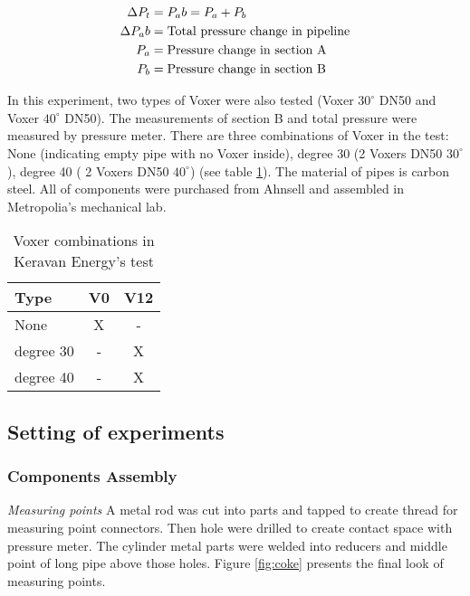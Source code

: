 \begin{align}
\Delta P_t&= P_ab = P_a + P_b \\
\Delta P_ab&= \textnormal{Total pressure change in pipeline} \\
P_a&= \textnormal{Pressure change in section A} \\
P_b&= \textnormal{Pressure change in section B} \\
\end{align}

In this experiment, two types of Voxer were also tested (Voxer $30^{\circ}$ DN50 and Voxer $40^{\circ}$ DN50). The measurements of section B and total pressure were measured by pressure meter. There are three combinations of Voxer in the test: None (indicating empty pipe with no Voxer inside), degree 30 (2 Voxers DN50 $30^{\circ}$), degree 40 ( 2 Voxers DN50 $40^{\circ}$) (see table \ref{table:kerava}). The material of pipes is carbon steel. All of components were purchased from Ahnsell and assembled in Metropolia's mechanical lab.

\begin{table}[h]
  \centering
  \caption{Voxer combinations in Keravan Energy's test}
  \begin{tabular}{l*{2}{c}}
Type             & V0 & V12 \\
\hline
None & X & -   \\
degree 30           & - & X   \\
degree 40          & - & X   \\
\end{tabular}
  \label{table:kerava}
\end{table}

\subsection{Setting of experiments}

\subsubsection{Components Assembly}

\textit{Measuring points}\newline
A metal rod was cut into parts and tapped to create thread for measuring point connectors. Then hole were drilled to create contact space with pressure meter. The cylinder metal parts were welded into reducers and middle point of long pipe above those holes. Figure \vref{fig:coke} presents the final look of measuring points.

